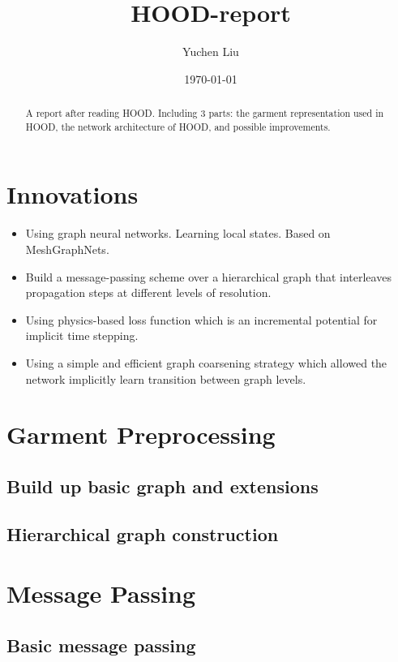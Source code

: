 \documentclass{article}
\title{HOOD-report}
\author{Yuchen Liu}
\date{\today}
\begin{document}
\maketitle
\tableofcontents
\begin{abstract}
    A report after reading HOOD\cite{grigorev2023hood}. Including 3 parts: the garment representation used in HOOD, the network architecture of HOOD, and possible improvements.
\end{abstract}
\section{Innovations}
\begin{itemize}
    \item Using graph neural networks. Learning local states. Based on MeshGraphNets\cite{pfaff2021learning}.
    \item Build a message-passing scheme over a hierarchical graph that interleaves propagation steps at different levels of resolution.
    \item Using physics-based loss function which is an incremental potential for implicit time stepping.
    \item Using a simple and efficient graph coarsening strategy which allowed the network implicitly learn transition between graph levels.
\end{itemize}

\section{Garment Preprocessing}
\subsection{Build up basic graph and extensions}
\subsubsection{}
\subsection{Hierarchical graph construction}

\section{Message Passing}
\subsection{Basic message passing}
\end{document}
